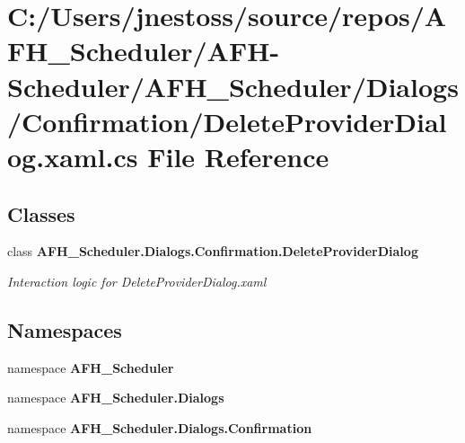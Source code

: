 \section{C\+:/\+Users/jnestoss/source/repos/\+A\+F\+H\+\_\+\+Scheduler/\+A\+F\+H-\/\+Scheduler/\+A\+F\+H\+\_\+\+Scheduler/\+Dialogs/\+Confirmation/\+Delete\+Provider\+Dialog.xaml.\+cs File Reference}
\label{_delete_provider_dialog_8xaml_8cs}
\subsection*{Classes}
\begin{DoxyCompactItemize}
\item 
class \textbf{ A\+F\+H\+\_\+\+Scheduler.\+Dialogs.\+Confirmation.\+Delete\+Provider\+Dialog}
\begin{DoxyCompactList}\small\item\em Interaction logic for Delete\+Provider\+Dialog.\+xaml \end{DoxyCompactList}\end{DoxyCompactItemize}
\subsection*{Namespaces}
\begin{DoxyCompactItemize}
\item 
namespace \textbf{ A\+F\+H\+\_\+\+Scheduler}
\item 
namespace \textbf{ A\+F\+H\+\_\+\+Scheduler.\+Dialogs}
\item 
namespace \textbf{ A\+F\+H\+\_\+\+Scheduler.\+Dialogs.\+Confirmation}
\end{DoxyCompactItemize}
